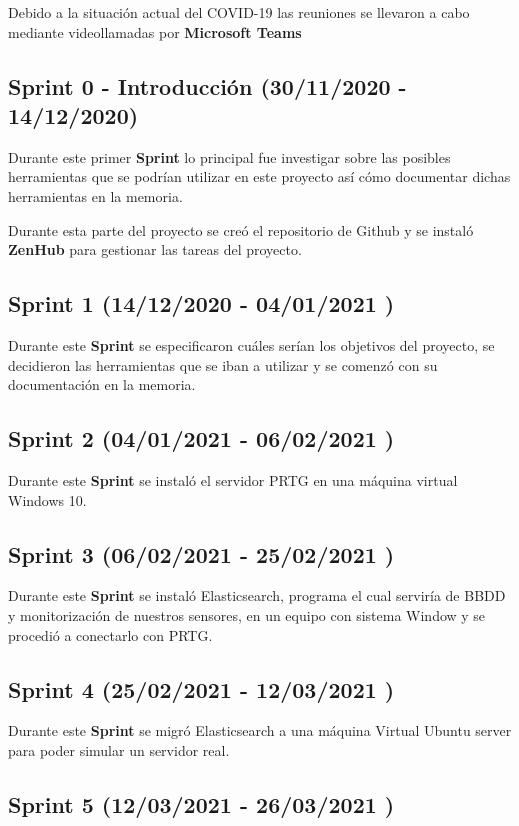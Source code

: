 Debido a la situación actual del COVID-19 las reuniones se llevaron a cabo mediante videollamadas por \textbf{Microsoft Teams}

\subsection{Sprint 0 - Introducción (30/11/2020 - 14/12/2020)}

Durante este primer \textbf{Sprint} lo principal fue investigar sobre las posibles herramientas que se podrían utilizar en este proyecto así cómo documentar dichas herramientas en la memoria.

Durante esta parte del proyecto se creó el repositorio de Github y se instaló \textbf{ZenHub} para gestionar las tareas del proyecto.

\subsection{Sprint 1   (14/12/2020 - 04/01/2021 )}

Durante este \textbf{Sprint} se especificaron cuáles serían los objetivos del proyecto, se decidieron las herramientas que se iban a utilizar y se comenzó con su documentación en la memoria.

\subsection{Sprint 2   (04/01/2021 - 06/02/2021 )}

Durante este \textbf{Sprint} se instaló el servidor PRTG en una máquina virtual Windows 10.

\subsection{Sprint 3   (06/02/2021 - 25/02/2021 )}

Durante este \textbf{Sprint} se instaló Elasticsearch, programa el cual serviría de BBDD y monitorización de nuestros sensores, en un equipo con sistema Window y se procedió a conectarlo con PRTG. 

\subsection{Sprint 4   (25/02/2021 - 12/03/2021 )}
Durante este \textbf{Sprint} se migró Elasticsearch a una máquina Virtual Ubuntu server para poder simular un servidor real.


\subsection{Sprint 5   (12/03/2021 - 26/03/2021 )}

